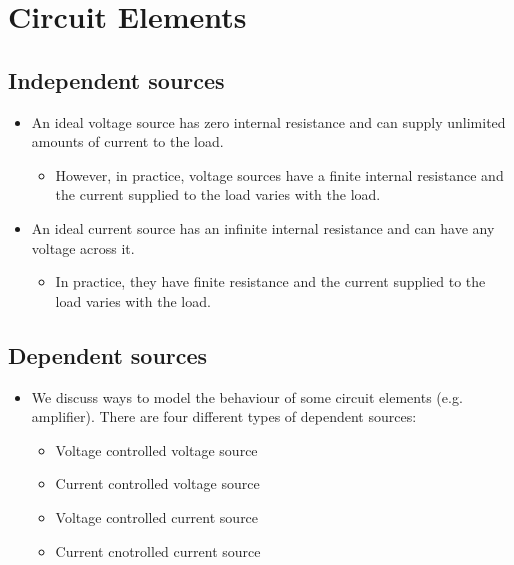 \section{Circuit Elements}
\subsection*{Independent sources}
\begin{itemize}
    \item An ideal voltage source has zero internal resistance and can supply unlimited amounts of current to the load.
    \begin{itemize}
        \item However, in practice, voltage sources have a finite internal resistance and the current supplied to the load varies with the load.
    \end{itemize}
    \item An ideal current source has an infinite internal resistance and can have any voltage across it.
    \begin{itemize}
        \item In practice, they have finite resistance and the current supplied to the load varies with the load.
    \end{itemize}
\end{itemize}
\subsection*{Dependent sources}
\begin{itemize}
    \item We discuss ways to model the behaviour of some circuit elements (e.g. amplifier). There are four different types of dependent sources:
    \begin{itemize}
        \item Voltage controlled voltage source
        \item Current controlled voltage source
        \item Voltage controlled current source
        \item Current cnotrolled current source
    \end{itemize}
\end{itemize}